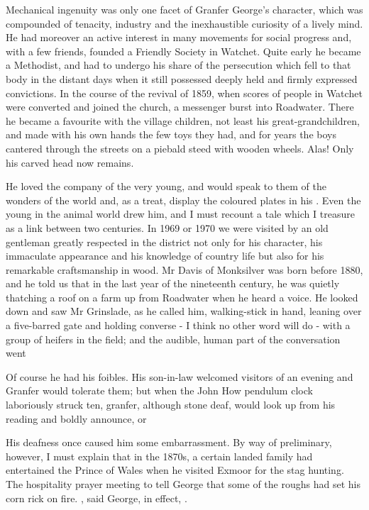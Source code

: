 Mechanical ingenuity was only one facet of Granfer George's character, which was compounded of tenacity, industry and the inexhaustible curiosity of a lively mind. He had moreover an active interest in many movements for social progress and, with a few friends, founded a Friendly Society in Watchet. Quite early he became a Methodist, and had to undergo his share of the persecution which fell to that body in the distant days when it still possessed deeply held and firmly expressed convictions. In the course of the revival of 1859, when scores of people in Watchet were converted and joined the church, a messenger burst into Roadwater. There he became a favourite with the village children, not least his great-grandchildren, and made with his own hands the few toys they had, and for years the boys cantered through the streets on a piebald steed with wooden wheels. Alas! Only his carved head now remains.

He loved the company of the very young, and would speak to them of the wonders of the world and, as a treat, display the coloured plates in his . Even the young in the animal world drew him, and I must recount a tale which I treasure as a link between two centuries. In 1969 or 1970 we were visited by an old gentleman greatly respected in the district not only for his character, his immaculate appearance and his knowledge of country life but also for his remarkable craftsmanship in wood. Mr Davis of Monksilver was born before 1880, and he told us that in the last year of the nineteenth century, he was quietly thatching a roof on a farm up from Roadwater when he heard a voice. He looked down and saw Mr Grinslade, as he called him, walking-stick in hand, leaning over a five-barred gate and holding converse - I think no other word will do - with a group of heifers in the field; and the audible, human part of the conversation went 

Of course he had his foibles. His son-in-law welcomed visitors of an evening and Granfer would tolerate them; but when the John How pendulum clock laboriously struck ten, granfer, although stone deaf, would look up from his reading and boldly announce,  or 

His deafness once caused him some embarrassment. By way of preliminary, however, I must explain that in the 1870s, a certain landed family had entertained the Prince of Wales when he visited Exmoor for the stag hunting. The hospitality prayer meeting to tell George that some of the roughs had set his corn rick on fire. , said George, in effect, .

